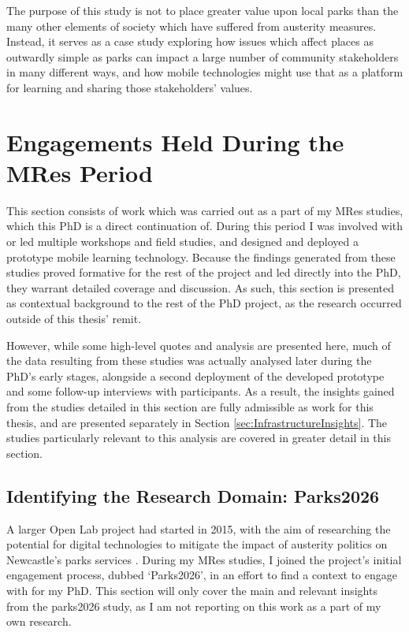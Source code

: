 The purpose of this study is not to place greater value upon local parks than the many other elements of society which have suffered from austerity measures. Instead, it serves as a case study exploring how issues which affect places as outwardly simple as parks can impact a large number of community stakeholders in many different ways, and how mobile technologies might use that as a platform for learning and sharing those stakeholders' values.

\section{Engagements Held During the MRes Period}

This section consists of work which was carried out as a part of my MRes studies, which this PhD is a direct continuation of. During this period I was involved with or led multiple workshops and field studies, and designed and deployed a prototype mobile learning technology. Because the findings generated from these studies proved formative for the rest of the project and led directly into the PhD, they warrant detailed coverage and discussion. As such, this section is presented as contextual background to the rest of the PhD project, as the research occurred outside of this thesis' remit.  

However, while some high-level quotes and analysis are presented here, much of the data resulting from these studies was actually analysed later during the PhD's early stages, alongside a second deployment of the developed prototype and some follow-up interviews with participants. As a result, the insights gained from the studies detailed in this section are fully admissible as work for this thesis, and are presented separately in Section \ref{sec:InfrastructureInsights}. The studies particularly relevant to this analysis are covered in greater detail in this section.

\subsection{Identifying the Research Domain: Parks2026}
\label{sec:Parks2026}

A larger Open Lab project had started in 2015, with the aim of researching the potential for digital technologies to mitigate the impact of austerity politics on Newcastle's parks services \citep{Crivellaro2019}. During my MRes studies, I joined the project's initial engagement process, dubbed `Parks2026', in an effort to find a context to engage with for my PhD. This section will only cover the main and relevant insights from the parks2026 study, as I am not reporting on this work as a part of my own research.

